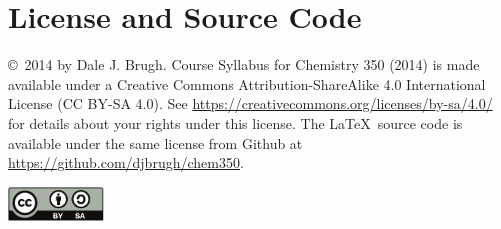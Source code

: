 \documentclass[letterpaper,oneside,onecolumn,11pt,article]{memoir}
\begin{document}
\section{License and Source Code}
\copyright\ 2014 by Dale J. Brugh. Course Syllabus for Chemistry 350 (2014) is made available under a Creative Commons Attribution-ShareAlike 4.0 International License (CC BY-SA 4.0). See \href{https://creativecommons.org/licenses/by-sa/4.0/}{https://creativecommons.org/licenses/by-sa/4.0/} for details about your rights under this license. The \LaTeX\ source code is available under the same license from Github at \href{https://github.com/djbrugh/chem350}{https://github.com/djbrugh/chem350}.

\vspace{0.25in}
\noindent\includegraphics[width=1in]{figs/cc-by-sa.pdf}
\end{document}
